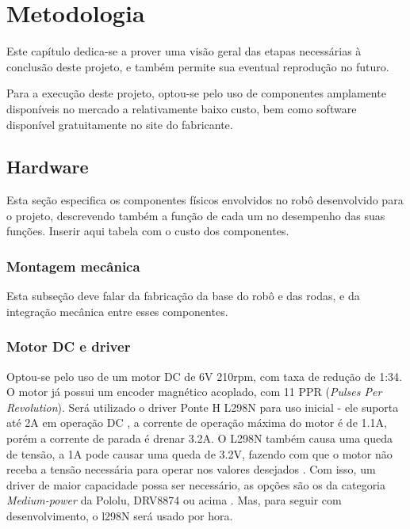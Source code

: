 
\chapter{Metodologia}

{\color{red}Este capítulo dedica-se a prover uma visão geral das etapas necessárias à conclusão deste projeto, e também
permite sua eventual reprodução no futuro.}

Para a execução deste projeto, optou-se pelo uso de componentes amplamente disponíveis no mercado a relativamente baixo
custo, bem como software disponível gratuitamente no site do fabricante.


\section{Hardware}
{\color{red} Esta seção especifica os componentes físicos envolvidos no robô desenvolvido para o projeto, descrevendo
também a função de cada um no desempenho das suas funções.}
{\color{red} Inserir aqui tabela com o custo dos componentes.}

\subsection{Montagem mecânica}
{\color{red} Esta subseção deve falar da fabricação da base do robô e das rodas, e da integração mecânica entre esses
componentes.}

\subsection{Motor DC e driver}
Optou-se pelo uso de um motor DC de 6V 210rpm, com taxa de redução de 1:34. O motor já possui um encoder magnético
acoplado, com 11 PPR (\textit{Pulses Per Revolution}). Será utilizado o driver Ponte H L298N para uso inicial - ele
suporta até 2A em operação DC \cite{datasheel_l298n}, a corrente de operação máxima do motor é de 1.1A, porém a corrente
de parada é drenar 3.2A. O L298N também causa uma queda de tensão, a 1A pode causar uma queda de 3.2V, fazendo com que o
motor não receba a tensão necessária para operar nos valores desejados \cite{datasheel_l298n}. Com isso, um driver de
maior capacidade possa ser necessário, as opções são os da categoria \textit{Medium-power} da Pololu, DRV8874 ou acima
\cite{DRV8874}. Mas, para seguir com desenvolvimento, o l298N será usado por hora.

